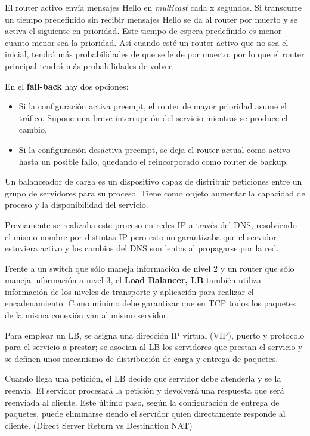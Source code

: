 El router activo envía mensajes Hello en \textit{multicast} cada x segundos. Si transcurre un tiempo predefinido sin recibir mensajes Hello se da al router por muerto y se activa el siguiente en prioridad. Este tiempo de espera predefinido es menor cuanto menor sea la prioridad. Así cuando esté un router activo que no sea el inicial, tendrá más probabilidades de que se le de por muerto, por lo que el router principal tendrá más probabilidades de volver.

En el \textbf{fail-back} hay dos opciones:
\begin{itemize}
\item Si la configuración activa preempt, el router de mayor prioridad asume el tráfico. Supone una breve interrupción del servicio mientras se produce el cambio.
\item Si la configuración desactiva preempt, se deja el router actual como activo hasta un posible fallo, quedando el reincorporado como router de backup.
\end{itemize}

\begin{defn}
Un balanceador de carga es un dispositivo capaz de distribuir peticiones entre un grupo de servidores para su proceso. Tiene como objeto aumentar la capacidad de proceso y la disponibilidad del servicio.

Previamente se realizaba este proceso en redes IP a través del DNS, resolviendo el mismo nombre por distintas IP pero esto no garantizaba que el servidor estuviera activo y los cambios del DNS son lentos al propagarse por la red.

Frente a un switch que sólo maneja información de nivel 2 y un router que sólo maneja información a nivel 3, el \textbf{Load Balancer, LB} también utiliza información de los niveles de transporte y aplicación para realizar el encadenamiento. Como mínimo debe garantizar que en TCP todos los paquetes de la misma conexión van al mismo servidor.
\end{defn}

Para emplear un LB, se asigna una dirección IP virtual (VIP), puerto y protocolo para el servicio a prestar; se asocian al LB los servidores que prestan el servicio y se definen unos mecanismo de distribución de carga y entrega de paquetes.

Cuando llega una petición, el LB decide que servidor debe atenderla y se la reenvía. El servidor procesará la petición y devolverá una respuesta que será reenviada al cliente. Este último paso, según la configuración de entrega de paquetes, puede eliminarse siendo el servidor quien directamente responde al cliente. (Direct Server Return vs Destination NAT)

